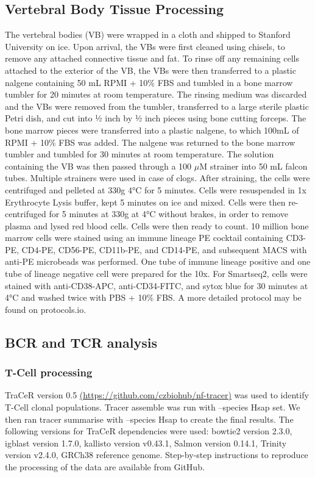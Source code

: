 \subsection{Vertebral Body Tissue Processing}
The vertebral bodies (VB) were wrapped in a cloth and shipped to Stanford University on ice.
Upon arrival, the VBs were first cleaned using chisels, to remove any attached connective tissue
and fat. To rinse off any remaining cells attached to the exterior of the VB, the VBs were then
transferred to a plastic nalgene containing 50 mL RPMI + 10\% FBS and tumbled in a bone marrow
tumbler for 20 minutes at room temperature. The rinsing medium was discarded and the VBs
were removed from the tumbler, transferred to a large sterile plastic Petri dish, and cut into ½ inch
by ½ inch pieces using bone cutting forceps. The bone marrow pieces were transferred into a
plastic nalgene, to which 100mL of RPMI + 10\% FBS was added. The nalgene was returned to
the bone marrow tumbler and tumbled for 30 minutes at room temperature. The solution
containing the VB was then passed through a 100 $\mu$M strainer into 50 mL falcon tubes. Multiple
strainers were used in case of clogs. After straining, the cells were centrifuged and pelleted at
330g 4°C for 5 minutes. Cells were resuspended in 1x Erythrocyte Lysis buffer, kept 5 minutes
on ice and mixed. Cells were then re-centrifuged for 5 minutes at 330g at 4°C without brakes, in
order to remove plasma and lysed red blood cells. Cells were then ready to count. 10 million bone
marrow cells were stained using an immune lineage PE cocktail containing CD3-PE, CD4-PE,
CD56-PE, CD11b-PE, and CD14-PE, and subsequent MACS with anti-PE microbeads was
performed. One tube of immune lineage positive and one tube of lineage negative cell were
prepared for the 10x. For Smartseq2, cells were stained with anti-CD38-APC, anti-CD34-FITC,
and sytox blue for 30 minutes at 4°C and washed twice with PBS + 10\% FBS. A more detailed protocol may be found on protocols.io. 
\subsection{BCR and TCR analysis}
\subsubsection{T-Cell processing}
TraCeR\cite{stubbington_t_2016} version 0.5 \url{(https://github.com/czbiohub/nf-tracer)} was used to identify T-Cell clonal
populations. Tracer assemble was run with --species Hsap set. We then ran tracer summarise
with --species Hsap to create the final results. The following versions for TraCeR dependencies
were used: bowtie2 version 2.3.0, igblast version 1.7.0, kallisto version v0.43.1, Salmon version
0.14.1, Trinity version v2.4.0, GRCh38 reference genome. Step-by-step instructions to reproduce
the processing of the data are available from GitHub.
